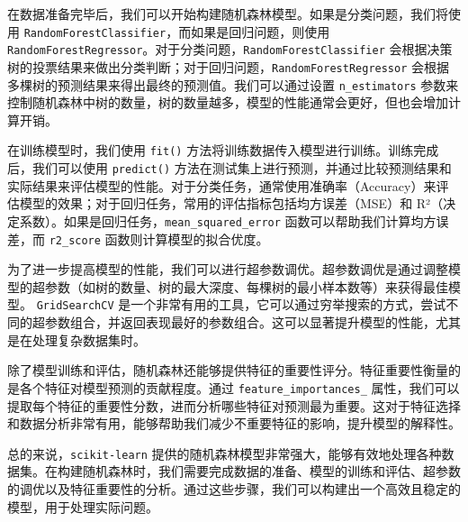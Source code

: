 \documentclass[AutoFakeBold]{LZUThesis-PgD&PhD}
\begin{document}
        在数据准备完毕后，我们可以开始构建随机森林模型。如果是分类问题，我们将使用 \texttt{RandomForestClassifier}，而如果是回归问题，则使用 \texttt{RandomForestRegressor}。对于分类问题，\texttt{RandomForestClassifier} 会根据决策树的投票结果来做出分类判断；对于回归问题，\texttt{RandomForestRegressor} 会根据多棵树的预测结果来得出最终的预测值。我们可以通过设置 \texttt{n\_estimators} 参数来控制随机森林中树的数量，树的数量越多，模型的性能通常会更好，但也会增加计算开销。
        
        在训练模型时，我们使用 \texttt{fit()} 方法将训练数据传入模型进行训练。训练完成后，我们可以使用 \texttt{predict()} 方法在测试集上进行预测，并通过比较预测结果和实际结果来评估模型的性能。对于分类任务，通常使用准确率（Accuracy）来评估模型的效果；对于回归任务，常用的评估指标包括均方误差（MSE）和 R²（决定系数）。如果是回归任务，\texttt{mean\_squared\_error} 函数可以帮助我们计算均方误差，而 \texttt{r2\_score} 函数则计算模型的拟合优度。
        
        为了进一步提高模型的性能，我们可以进行超参数调优。超参数调优是通过调整模型的超参数（如树的数量、树的最大深度、每棵树的最小样本数等）来获得最佳模型。 \texttt{GridSearchCV} 是一个非常有用的工具，它可以通过穷举搜索的方式，尝试不同的超参数组合，并返回表现最好的参数组合。这可以显著提升模型的性能，尤其是在处理复杂数据集时。
        
        除了模型训练和评估，随机森林还能够提供特征的重要性评分。特征重要性衡量的是各个特征对模型预测的贡献程度。通过 \texttt{feature\_importances\_} 属性，我们可以提取每个特征的重要性分数，进而分析哪些特征对预测最为重要。这对于特征选择和数据分析非常有用，能够帮助我们减少不重要特征的影响，提升模型的解释性。
        
        总的来说，\texttt{scikit-learn} 提供的随机森林模型非常强大，能够有效地处理各种数据集。在构建随机森林时，我们需要完成数据的准备、模型的训练和评估、超参数的调优以及特征重要性的分析。通过这些步骤，我们可以构建出一个高效且稳定的模型，用于处理实际问题。
            
\end{document}
